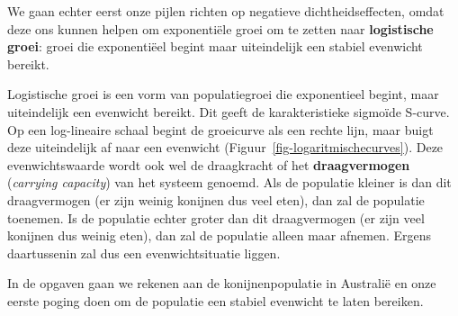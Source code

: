 \documentclass[
  a4paper,
]{scrbook}
\theoremstyle{definition}
\theoremstyle{remark}
\newcounter{quartocallouttipno}
\newcommand{\quartocallouttip}[1]{\refstepcounter{quartocallouttipno}\label{#1}}
\begin{document}
We gaan echter eerst onze pijlen richten op negatieve
dichtheidseffecten, omdat deze ons kunnen helpen om exponentiële groei
om te zetten naar \textbf{logistische groei}: groei die exponentiëel
begint maar uiteindelijk een stabiel evenwicht bereikt.

\begin{tcolorbox}[enhanced jigsaw, rightrule=.15mm, opacityback=0, leftrule=.75mm, title=\textcolor{quarto-callout-note-color}{\faInfo}\hspace{0.5em}{Tip \ref*{tip-logaritmisch}: Logaritmische groei}, toptitle=1mm, titlerule=0mm, opacitybacktitle=0.6, colframe=quarto-callout-note-color-frame, breakable, colbacktitle=quarto-callout-note-color!10!white, coltitle=black, toprule=.15mm, bottomrule=.15mm, left=2mm, bottomtitle=1mm, arc=.35mm, colback=white]

\quartocallouttip{tip-logaritmisch} 

Logistische groei is een vorm van populatiegroei die exponentieel
begint, maar uiteindelijk een evenwicht bereikt. Dit geeft de
karakteristieke sigmoïde S-curve. Op een log-lineaire schaal begint de
groeicurve als een rechte lijn, maar buigt deze uiteindelijk af naar een
evenwicht (Figuur~\ref{fig-logaritmischecurves}). Deze evenwichtswaarde
wordt ook wel de draagkracht of het \textbf{draagvermogen}
(\emph{carrying capacity}) van het systeem genoemd. Als de populatie
kleiner is dan dit draagvermogen (er zijn weinig konijnen dus veel
eten), dan zal de populatie toenemen. Is de populatie echter groter dan
dit draagvermogen (er zijn veel konijnen dus weinig eten), dan zal de
populatie alleen maar afnemen. Ergens daartussenin zal dus een
evenwichtsituatie liggen.

In de opgaven gaan we rekenen aan de konijnenpopulatie in Australië en
onze eerste poging doen om de populatie een stabiel evenwicht te laten
bereiken.


\end{tcolorbox}
\end{document}
